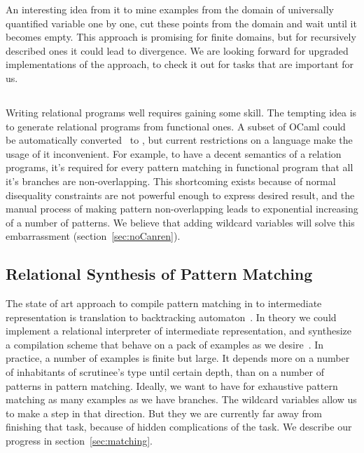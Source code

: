 An interesting idea from \cite{universal2021} it to mine examples from the domain of universally quantified variable one by one, cut these points from the domain and wait until it becomes empty. This approach is promising for finite domains, but for recursively described ones it could lead to divergence. We are looking forward for upgraded implementations of the approach, to check it out for tasks that are important for us. 

\subsection{\noCanren{}}

Writing relational programs well requires gaining some skill. The tempting idea is to generate relational programs from functional ones. A subset of OCaml 
could be automatically converted~\cite{RelConversion} to \OCanren{}, but current restrictions on a language make the usage of it inconvenient. For example, to have a decent semantics of a relation programs, it's required for every pattern matching in functional program that all it's branches are non-overlapping. This shortcoming exists because of normal disequality constraints are not powerful enough to express desired result, and the manual process of making pattern non-overlapping leads to exponential increasing of a number of patterns. We believe that adding wildcard variables will solve this embarrassment (section~\ref{sec:noCanren}).

\subsection{Relational Synthesis of Pattern Matching}

The state of art approach to compile pattern matching in \OCaml{} to intermediate representation is translation to backtracking automaton~\cite{maranget2001}. In theory we could implement a relational interpreter of intermediate representation, and synthesize a compilation scheme that behave on a pack of examples as we desire~\cite{Kosarev2020}. In practice, a number of examples is finite but large. It depends more on a number of inhabitants of scrutinee's type until certain depth, than on a number of patterns in pattern matching. Ideally, we want to have for exhaustive pattern matching as many examples as we have branches. The wildcard variables allow us to make a step in that direction. But they we are currently far away from finishing that task, because of hidden complications of the task. We describe our progress in section~\ref{sec:matching}.


